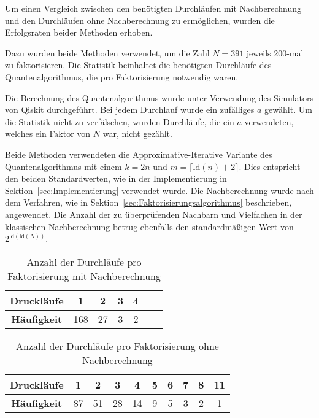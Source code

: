 Um einen Vergleich zwischen den benötigten Durchläufen mit Nachberechnung und den Durchläufen ohne Nachberechnung zu ermöglichen, 
wurden die Erfolgsraten beider Methoden erhoben.

Dazu wurden beide Methoden verwendet, um die Zahl \(N=391\) jeweils 200-mal zu faktorisieren.
Die Statistik beinhaltet die benötigten Durchläufe des Quantenalgorithmus, die pro Faktorisierung notwendig waren.

Die Berechnung des Quantenalgorithmus wurde unter Verwendung des Simulators von Qiskit durchgeführt. 
Bei jedem Durchlauf wurde ein zufälliges \(a\) gewählt.
Um die Statistik nicht zu verfälschen, wurden Durchläufe, die ein \(a\) verwendeten, 
welches ein Faktor von \(N\) war, nicht gezählt.

Beide Methoden verwendeten die Approximative-Iterative Variante des Quantenalgorithmus mit einem \(k=2n\) und \(m=\lceil\text{ld}(n)+2\rceil\).
Dies entspricht den beiden Standardwerten, 
wie in der Implementierung in Sektion~\ref{sec:Implementierung} verwendet wurde. 
Die Nachberechnung wurde nach dem Verfahren, wie in Sektion~\ref{sec:Faktorisierungsalgorithmus} beschrieben, angewendet. 
Die Anzahl der zu überprüfenden Nachbarn und Vielfachen in der klassischen Nachberechnung betrug ebenfalls den standardmäßigen Wert von \(2^{\text{ld}(\text{ld}(N))}\).

\begin{table}[h] \label{Nachberechnung}
    \centering
    \caption{Anzahl der Durchläufe pro Faktorisierung mit Nachberechnung}
    \begin{tabular}{|c|c|c|c|c|c|c|} 
        \hline
        \textbf{Druckläufe} & 1 & 2 & 3 & 4\\
        \hline
        \textbf{Häufigkeit} & 168 & 27 & 3 & 2 \\
        \hline
    \end{tabular}
\end{table}

\begin{table}[h] \label{ohneNachberechnung}
    \centering
    \caption{Anzahl der Durchläufe pro Faktorisierung ohne Nachberechnung}
    \begin{tabular}{|c|c|c|c|c|c|c|c|c|c|} 
        \hline
        \textbf{Druckläufe} & 1 & 2 & 3 & 4 & 5 & 6 & 7 & 8 & 11 \\
        \hline
        \textbf{Häufigkeit} & 87 & 51 & 28 & 14 & 9 & 5 & 3 & 2 & 1 \\
        \hline
    \end{tabular}
\end{table}

